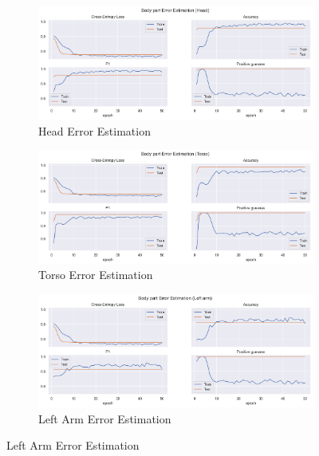 \begin{figure}[htbp]
  \centering
  \begin{subfigure}[b]{0.9\linewidth}
      \centering
      \includegraphics[width=\textwidth]{figures/Results/v2/bp/Head_ErrorEstimation.png}
      \caption{Head Error Estimation}
      \label{fig:head_lb_ee}
  \end{subfigure}
  \hfill
  \begin{subfigure}[b]{0.9\linewidth}
      \centering
      \includegraphics[width=\textwidth]{figures/Results/v2/bp/Torso_ErrorEstimation.png}
      \caption{Torso Error Estimation}
      \label{fig:torso_lb_ee}
  \end{subfigure}
  \hfill
  \begin{subfigure}[b]{0.9\linewidth}
      \centering
      \includegraphics[width=\textwidth]{figures/Results/v2/bp/Left arm_ErrorEstimation.png}
      \caption{Left Arm Error Estimation}
      \label{fig:lear_lb_ee}
  \end{subfigure}
\end{figure}

